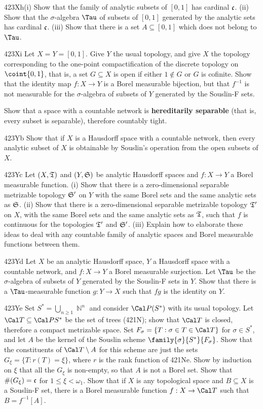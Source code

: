 {\sqheader 423Xh(i) Show that the family of analytic subsets of $[0,1]$
has cardinal $\frak c$.      (ii) Show that the
$\sigma$-algebra $\Tau$ of subsets of $[0,1]$ generated by the analytic
sets has cardinal $\frak c$.     (iii) Show that
there is a set $A\subseteq[0,1]$ which does not belong to $\Tau$.

\spheader 423Xi Let $X=Y=[0,1]$.   Give $Y$ the usual topology, and give
$X$ the topology corresponding to the one-point compactification of the
discrete topology on $\coint{0,1}$, that is, a set $G\subseteq X$ is
open if either $1\notin G$ or $G$ is cofinite.   Show that the identity
map $f:X\to Y$ is a Borel measurable bijection, but that $f^{-1}$ is not
measurable for the $\sigma$-algebra of subsets of $Y$ generated by the
Souslin-F sets.

Show that a space with a countable network is {\bf hereditarily
separable} (that is, every subset is separable), therefore countably
tight.

\spheader 423Yb
Show that if $X$ is a Hausdorff space with a countable network, then
every analytic subset of $X$ is
obtainable by Souslin's operation from the open subsets of $X$.

\spheader 423Yc Let $(X,\frak T)$ and $(Y,\frak S)$ be analytic
Hausdorff
spaces and $f:X\to Y$ a Borel measurable function.   (i) Show that there
is a zero-dimensional separable metrizable topology $\frak S'$ on $Y$
with the same Borel sets and the same analytic sets as $\frak S$.
  (ii) Show that there is a zero-dimensional
separable metrizable topology $\frak T'$ on $X$, with the same Borel
sets and the same analytic sets as $\frak T$, such that $f$ is
continuous for the topologies $\frak T'$ and
$\frak S'$.   (iii) Explain how to elaborate these ideas
to deal with any countable family of analytic spaces and Borel
measurable functions between them.

\spheader 423Yd Let $X$ be an analytic Hausdorff space, $Y$ a Hausdorff
space with a countable network, and $f:X\to Y$ a Borel measurable
surjection.   Let
$\Tau$ be the $\sigma$-algebra of subsets of $Y$ generated by the
Souslin-F sets
in $Y$.    Show that there is a $\Tau$-measurable function $g:Y\to X$
such that $fg$ is the identity on $Y$.

\spheader 423Ye Set $S^*=\bigcup_{n\ge 1}\BbbN^n$ and consider 
$\Cal P(S^*)$
with its usual topology.   Let $\Cal T\subseteq\Cal PS^*$ be the set of
trees (421N);  show that $\Cal T$ is closed, therefore a compact
metrizable space.   Set $F_{\sigma}=\{T:\sigma\in T\in\Cal T\}$ for
$\sigma\in S^*$, and let $A$ be the kernel of the Souslin scheme
$\family{\sigma}{S^*}{F_{\sigma}}$.   Show that the constituents of
$\Cal T\setminus A$ for this scheme are just the sets
$G_{\xi}=\{T:r(T)=\xi\}$, where $r$ is the rank function of 421Ne.
Show by induction on $\xi$ that all the $G_{\xi}$ is non-empty, so that
$A$ is not a Borel set.   Show that $\#(G_{\xi})=\frak c$ for
$1\le\xi<\omega_1$.   Show that if $X$ is any topological space and
$B\subseteq X$ is a Souslin-F set, there is a Borel measurable function
$f:X\to\Cal T$ such that $B=f^{-1}[A]$.
}%

